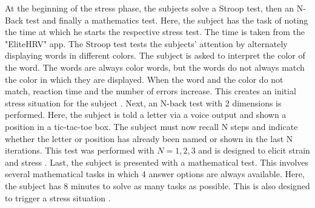 At the beginning of the stress phase, the subjects solve a Stroop test, then an N-Back test and finally a mathematics test. 
Here, the subject has the task of noting the time at which he starts the respective stress test.
The time is taken from the "EliteHRV" app.
The Stroop test tests the subjects' attention by alternately displaying words in different colors. 
The subject is asked to interpret the color of the word. The words are always color words, but the words do not always match the color in which they are displayed. 
When the word and the color do not match, reaction time and the number of errors increase. 
This creates an initial stress situation for the subject \cite{StroopCompetitionSocialEvaluative}. 
Next, an N-back test with 2 dimensions is performed. 
Here, the subject is told a letter via a voice output and shown a position in a tic-tac-toe box. 
The subject must now recall N steps and indicate whether the letter or position has already been named or shown in the last N iterations. 
This test was performed with $N={1,2,3}$ and is designed to elicit strain and stress \cite{liangEffectAcuteStress2023}.
Last, the subject is presented with a mathematical test. 
This involves several mathematical tasks in which 4 answer options are always available.
Here, the subject has 8 minutes to solve as many tasks as possible. 
This is also designed to trigger a stress situation \cite{caviolaStressTimePressure2017}.

